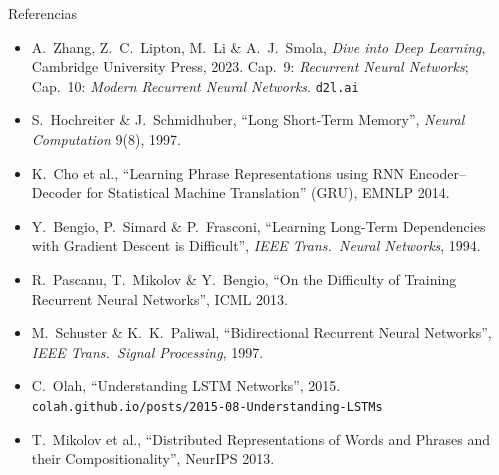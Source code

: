 \documentclass[aspectratio=169, 10pt]{beamer}
\begin{document}
\begin{frame}{Referencias}

	\small
	\begin{itemize}
		\item A.\ Zhang, Z.\ C.\ Lipton, M.\ Li \& A.\ J.\ Smola, \textit{Dive into Deep Learning}, Cambridge University Press, 2023. Cap.\ 9: \textit{Recurrent Neural Networks}; Cap.\ 10: \textit{Modern Recurrent Neural Networks}. \texttt{d2l.ai}
		\item S.\ Hochreiter \& J.\ Schmidhuber, ``Long Short-Term Memory'', \textit{Neural Computation} 9(8), 1997.
		\item K.\ Cho et al., ``Learning Phrase Representations using RNN Encoder--Decoder for Statistical Machine Translation'' (GRU), EMNLP 2014.
		\item Y.\ Bengio, P.\ Simard \& P.\ Frasconi, ``Learning Long-Term Dependencies with Gradient Descent is Difficult'', \textit{IEEE Trans.\ Neural Networks}, 1994.
		\item R.\ Pascanu, T.\ Mikolov \& Y.\ Bengio, ``On the Difficulty of Training Recurrent Neural Networks'', ICML 2013.
		\item M.\ Schuster \& K.\ K.\ Paliwal, ``Bidirectional Recurrent Neural Networks'', \textit{IEEE Trans.\ Signal Processing}, 1997.
		\item C.\ Olah, ``Understanding LSTM Networks'', 2015. \texttt{colah.github.io/posts/2015-08-Understanding-LSTMs}
		\item T.\ Mikolov et al., ``Distributed Representations of Words and Phrases and their Compositionality'', NeurIPS 2013.
	\end{itemize}

\end{frame}
\end{document}
